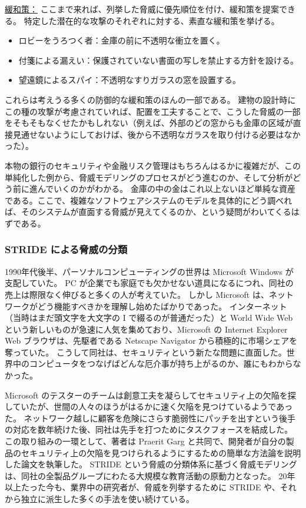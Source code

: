 \documentclass[uplatex]{jsarticle}
\def\label#1{}%
\begin{document}
\underline{緩和策：}
ここまで来れば、列挙した脅威に優先順位を付け、緩和策を提案できる。
特定した潜在的な攻撃のそれぞれに対する、素直な緩和策を挙げる。
\begin{itemize}
\item ロビーをうろつく者：金庫の前に不透明な衝立を置く。
\item 付箋による漏えい：保護されていない書面の写しを禁止する方針を設ける。
\item 望遠鏡によるスパイ：不透明なすりガラスの窓を設置する。
\end{itemize}
これらは考えうる多くの防御的な緩和策のほんの一部である。
建物の設計時にこの種の攻撃が考慮されていれば、配置を工夫することで、こうした脅威の一部をそもそもなくせたかもしれない（例えば、外部のどの窓からも金庫の区域が直接見通せないようにしておけば、後から不透明なガラスを取り付ける必要はなかった）。

本物の銀行のセキュリティや金融リスク管理はもちろんはるかに複雑だが、この単純化した例から、脅威モデリングのプロセスがどう進むのか、そして分析がどう前に進んでいくのかがわかる。
金庫の中の金はこれ以上ないほど単純な資産である。ここで、複雑なソフトウェアシステムのモデルを具体的にどう調べれば、そのシステムが直面する脅威が見えてくるのか、という疑問がわいてくるはずである。

\subsubsection{STRIDE による脅威の分類}\label{subsec:ch2-stride}

1990年代後半、パーソナルコンピューティングの世界は Microsoft Windows が支配していた。
PC が企業でも家庭でも欠かせない道具になるにつれ、同社の売上は際限なく伸びると多くの人が考えていた。
しかし Microsoft は、ネットワークがどう機能すべきかを理解し始めたばかりであった。
インターネット（当時はまだ頭文字を大文字の I で綴るのが普通だった）と World Wide Web という新しいものが急速に人気を集めており、Microsoft の Internet Explorer Web ブラウザは、先駆者である Netscape Navigator から積極的に市場シェアを奪っていた。
こうして同社は、セキュリティという新たな問題に直面した。世界中のコンピュータをつなげばどんな厄介事が持ち上がるのか、誰にもわからなかった。

Microsoft のテスターのチームは創意工夫を凝らしてセキュリティ上の欠陥を探していたが、世間の人々のほうがはるかに速く欠陥を見つけているようであった。
ネットワーク越しに顧客を危険にさらす脆弱性にパッチを出すという後手の対応を数年続けた後、同社は先手を打つためにタスクフォースを結成した。
この取り組みの一環として、著者は Praerit Garg と共同で、開発者が自分の製品のセキュリティ上の欠陥を見つけられるようにするための簡単な方法論を説明した論文を執筆した。
STRIDE という脅威の分類体系に基づく脅威モデリングは、同社の全製品グループにわたる大規模な教育活動の原動力となった。
20年以上たった今も、業界中の研究者が、脅威を列挙するために STRIDE や、それから独立に派生した多くの手法を使い続けている。
\end{document}
